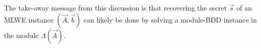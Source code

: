 The take-away message from this discussion is that recovering the secret $\vec s$ of an MLWE instance $(\vec A, \vec b)$ can likely be done by solving a module-BDD instance in the module $\Lambda(\vec A)$.







